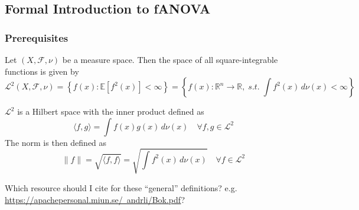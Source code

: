 

\subsection{Formal Introduction to fANOVA}
\subsubsection*{Prerequisites}
Let $(X, \mathcal{F}, \nu)$ be a measure space. Then the space of all square-integrable functions is given by
\[
\mathcal{L}^2(X, \mathcal{F}, \nu) = \left\{ f(x) : \mathbb{E}[f^2(x)] < \infty \right\}
= \left\{ f(x) : \mathbb{R}^{n} \to \mathbb{R}, \; \textit{s.t.} \; \int f^2(x)\, d\nu(x) < \infty \right\}
\]

$\mathcal{L}^2$ is a Hilbert space with the inner product defined as
\[
\langle f, g \rangle = \int f(x) g(x) \, d\nu(x) \quad \forall f, g \in \mathcal{L}^2
\]
The norm is then defined as
\[
\|f\| = \sqrt{\langle f, f \rangle} = \sqrt{\int f^2(x) \, d\nu(x)} \quad \forall f \in \mathcal{L}^2
\]

{\color{blue} Which resource should I cite for these ``general'' definitions? e.g. \href{https://apachepersonal.miun.se/~andrli/Bok.pdf}{https://apachepersonal.miun.se/~andrli/Bok.pdf}?}

